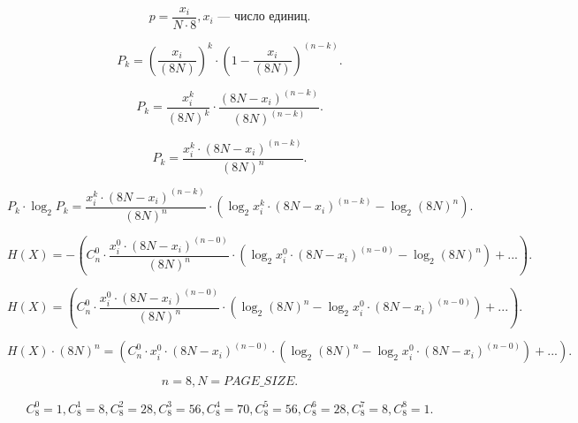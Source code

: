 \documentclass{bmstu}
\begin{document}
\begin{equation}
    p = \frac{x_i}{N \cdot 8}, x_i\text{ --- число единиц.}
\end{equation}

\begin{equation}\label{pk}
	P_{k} = (\frac{x_i}{(8N)})^k \cdot (1 - \frac{x_i}{(8N)})^{(n - k)}.
\end{equation}

\begin{equation}\label{pk}
	P_{k} = \frac{x_i^k}{(8N)^k} \cdot \frac{(8N - x_i)^{(n - k)}}{(8N)^{(n - k)}}.
\end{equation} 

\begin{equation}\label{pk}
	P_{k} = \frac{x_i^k \cdot (8N - x_i)^{(n - k)}}{(8N)^n}.
\end{equation}

\begin{equation}
    P_{k} \cdot \log_{2}P_{k} = \frac{x_i^k \cdot (8N - x_i)^{(n - k)}}{(8N)^n} \cdot (\log_{2}x_i^k \cdot (8N - x_i)^{(n - k)} - \log_{2}(8N)^n).
\end{equation}

\begin{equation}
    H(X) = -(C_{n}^0 \cdot \frac{x_i^0 \cdot (8N - x_i)^{(n - 0)}}{(8N)^n} \cdot (\log_{2}x_i^0 \cdot (8N - x_i)^{(n - 0)} - \log_{2}(8N)^n) + ...).
\end{equation}

\begin{equation}
    H(X) = (C_{n}^0 \cdot \frac{x_i^0 \cdot (8N - x_i)^{(n - 0)}}{(8N)^n} \cdot (\log_{2}(8N)^n - \log_{2}x_i^0 \cdot (8N - x_i)^{(n - 0)}) + ...).
\end{equation}

\begin{equation}
    H(X) \cdot (8N)^n = (C_{n}^0 \cdot x_i^0 \cdot (8N - x_i)^{(n - 0)} \cdot (\log_{2}(8N)^n - \log_{2}x_i^0 \cdot (8N - x_i)^{(n - 0)}) + ...).
\end{equation}

\begin{equation}
    n = 8, N = PAGE\_SIZE.
\end{equation}

\begin{equation}
    C_{8}^0 = 1, C_{8}^1 = 8, C_{8}^2 = 28, C_{8}^3 = 56, C_{8}^4 = 70, C_{8}^5 = 56, C_{8}^6 = 28, C_{8}^7 = 8, C_{8}^8 = 1.
\end{equation}
\end{document}
